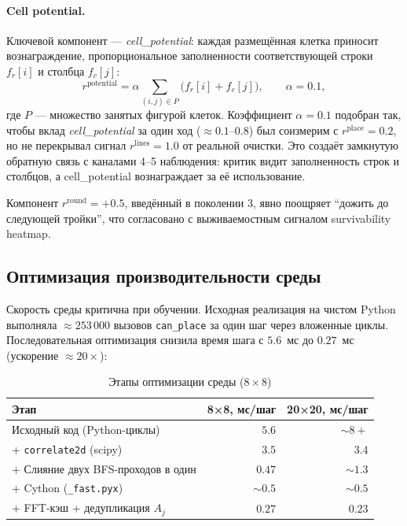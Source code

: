 \documentclass[12pt, a4paper]{article}
\begin{document}
\paragraph{Cell potential.}
Ключевой компонент --- \textit{cell\_potential}: каждая размещённая клетка приносит вознаграждение, пропорциональное заполненности соответствующей строки $f_r[i]$ и столбца $f_c[j]$:
\begin{equation}
  r^{\text{potential}} = \alpha \sum_{(i,j) \in P} \bigl( f_r[i] + f_c[j] \bigr),
  \qquad \alpha = 0.1,
\end{equation}
где $P$ --- множество занятых фигурой клеток. Коэффициент $\alpha = 0.1$ подобран так, чтобы вклад \textit{cell\_potential} за один ход (${\approx}0.1$--$0.8$) был соизмерим с $r^{\text{place}} = 0.2$, но не перекрывал сигнал $r^{\text{lines}} = 1.0$ от реальной очистки. Это создаёт замкнутую обратную связь с каналами 4--5 наблюдения: критик видит заполненность строк и столбцов, а cell\_potential вознаграждает за её использование.

Компонент $r^{\text{round}}=+0.5$, введённый в поколении 3, явно поощряет ``дожить до следующей тройки'', что согласовано с выживаемостным сигналом survivability heatmap.

\subsection{Оптимизация производительности среды}

Скорость среды критична при обучении. Исходная реализация на чистом Python выполняла ${\approx}253\,000$ вызовов \texttt{can\_place} за один шаг через вложенные циклы. Последовательная оптимизация снизила время шага с $5.6$~мс до $0.27$~мс (ускорение ${\approx}20\times$):

\begin{table}[H]
  \centering
  \caption{Этапы оптимизации среды ($8\times8$)}
  \label{tab:perf}
  \small
  \begin{tabular}{lrr}
    \toprule
    \textbf{Этап} & \textbf{8×8, мс/шаг} & \textbf{20×20, мс/шаг} \\
    \midrule
    Исходный код (Python-циклы)               & $5.6$ & ${\sim}8{+}$ \\
    + \texttt{correlate2d} (scipy)             & $3.5$ & $3.4$ \\
    + Слияние двух BFS-проходов в один         & $0.47$ & ${\sim}1.3$ \\
    + Cython (\texttt{\_fast.pyx})             & ${\sim}0.5$ & ${\sim}0.5$ \\
    + FFT-кэш + дедупликация $A_j$             & $\mathbf{0.27}$ & $\mathbf{0.23}$ \\
    \bottomrule
  \end{tabular}
\end{table}
\end{document}
